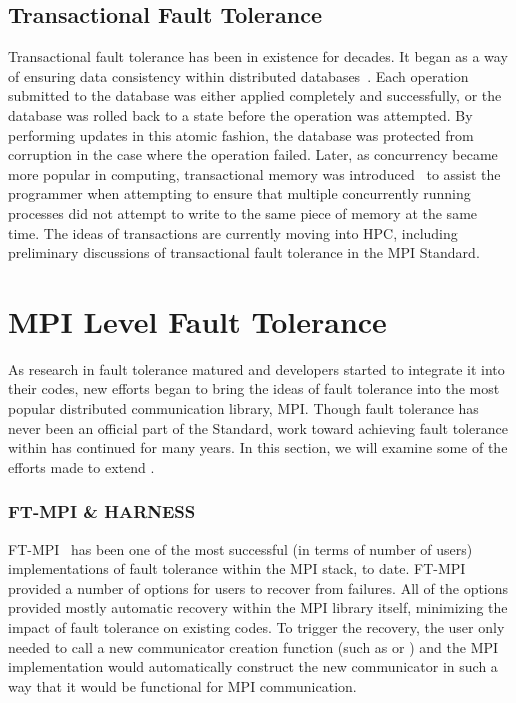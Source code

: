 \subsection{Transactional Fault Tolerance}
\label{subsec:background:types:transactions}

Transactional fault tolerance has been in existence for decades. It began as a 
way of ensuring data consistency within distributed 
databases~\cite{Bernstein:1981ut}. Each operation submitted to the database was either 
applied completely and successfully, or the database was rolled back to a state 
before the operation was attempted. By 
performing updates in this atomic fashion, the database was protected from 
corruption in the case where the operation failed. Later, as concurrency became  
more popular in computing, transactional memory was 
introduced~\cite{Herlihy:ug} to assist the programmer when attempting to ensure 
that multiple concurrently running processes did not attempt to write to the 
same piece of memory at the same time. The ideas of transactions are currently 
moving into HPC, including preliminary discussions of transactional fault 
tolerance in the MPI Standard.

\section{MPI Level Fault Tolerance}
\label{subsec:background:types:mpi-level}

As research in fault tolerance matured and developers started to integrate it into 
their codes, new efforts began to bring the ideas of fault tolerance into the most 
popular distributed communication library, MPI. Though fault tolerance has never been 
an official part of the \mpi Standard, work toward achieving fault tolerance within 
\mpi has continued for many years. In this section, we will examine some of the efforts 
made to extend \mpi.

\subsubsection{FT-MPI \& HARNESS}

FT-MPI~\cite{FaggFTMPI} has been one of the most successful (in terms of number 
of users) implementations of fault tolerance within the MPI stack, to date. 
FT-MPI provided a number of options for users to recover from failures. All of 
the options provided mostly automatic recovery within the MPI library itself, 
minimizing the impact of fault tolerance on existing codes. To trigger the 
recovery, the user only needed to call a new communicator creation function 
(such as  or ) and the MPI 
implementation would automatically construct the new communicator in such a way 
that it would be functional for MPI communication.

